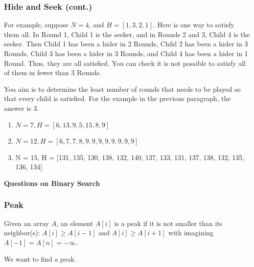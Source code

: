 \documentclass{beamer}
\begin{document}
\begin{frame}
\frametitle{Hide and Seek (cont.)}

For example, suppose $N = 4$, and $H = [1, 3, 2, 1]$. Here is one way to satisfy them all. In Round 1, Child 1 is the seeker, and in Rounds 2 and 3, Child 4 is the seeker. Then Child 1 has been a hider in 2 Rounds, Child 2 has been a hider in 3 Rounds, Child 3 has been a hider in 3 Rounds, and Child 4 has been a hider in 1 Round. Thus, they are all satisfied. You can check it is not possible to satisfy all of them in fewer than 3 Rounds.

You aim is to determine the least number of rounds that needs to be played so that every child is satisfied. For the example in the previous paragraph, the answer is 3.

\begin{enumerate}
\item[(a)] $N = 7, H = [6, 13, 9, 5, 15, 8, 9]$
\item[(b)] $N = 12, H = [6, 7, 7, 8, 9, 9, 9, 9, 9, 9, 9, 9]$
\item[(c)] N = 15, H = [131, 135, 130, 138, 132, 140, 137, 133, 131, 137, 138, 132, 135, 136, 134]
\end{enumerate}
\end{frame}

\begin{frame}
\end{frame}

\begin{frame}
  \begin{center}
    \Large\textbf{Questions on Binary Search}
  \end{center}
\end{frame}

\begin{frame}[fragile]
\frametitle{Peak}

Given an array $A$, an element $A[i]$ is a peak if it is not smaller than its neighbor(s): $A[i] \geq A[i-1]$ and $A[i] \geq A[i+1]$ with imagining $A[-1] = A[n] = -\infty$.

We want to find a peak.

\end{frame}

\begin{frame}
\end{frame}

\begin{frame}
\end{frame}
\end{document}

